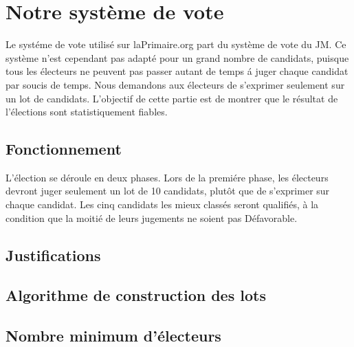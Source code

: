 \documentclass[conference]{IEEEtran}
\begin{document}




\section{Notre syst\`eme de vote}
\label{sec:laprimaire}

Le syst\'eme de vote utilis\'e sur laPrimaire.org part du syst\`eme de vote du JM. Ce syst\`eme n'est cependant pas adapt\'e pour un grand nombre de candidats, puisque tous les \'electeurs ne peuvent pas passer autant de temps \'a juger chaque candidat par soucis de temps. Nous demandons aux \'electeurs de s'exprimer seulement sur un lot de candidats. 
L'objectif de cette partie est de montrer que le r\'esultat de l'\'elections sont statistiquement fiables.

\subsection{Fonctionnement}
L'\'election se d\'eroule en deux phases. Lors de la premi\'ere phase, les \'electeurs devront juger seulement un lot de 10 candidats, plut\^ot que de s'exprimer sur chaque candidat. 
Les cinq candidats les mieux class\'es seront qualifi\'es, \`a la condition que la moiti\'e de leurs jugements ne soient pas D\'efavorable.


\subsection{Justifications}

\subsection{Algorithme de construction des lots}

\subsection{Nombre minimum d'\'electeurs}
\end{document}
